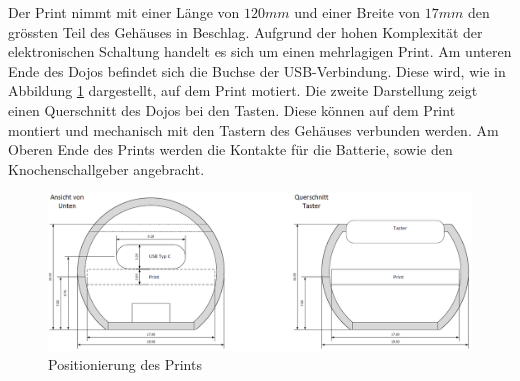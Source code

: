 Der Print nimmt mit einer Länge von $120mm$ und einer Breite von $17mm$ den grössten Teil des Gehäuses in Beschlag. Aufgrund der hohen Komplexität der elektronischen Schaltung handelt es sich um einen mehrlagigen Print. Am unteren Ende des Dojos befindet sich die Buchse der USB-Verbindung. Diese wird, wie in Abbildung \ref{fig:DojoPrintQuerschnitt} dargestellt, auf dem Print motiert. Die zweite Darstellung zeigt einen Querschnitt des Dojos bei den Tasten. Diese können auf dem Print montiert und mechanisch mit den Tastern des Gehäuses verbunden werden. Am Oberen Ende des Prints werden die Kontakte für die Batterie, sowie den Knochenschallgeber angebracht.

\begin{figure}[h]
	\centering
	\includegraphics[width=\textwidth]{graphics/DojoPrintQuerschnitt.png}
	\caption{Positionierung des Prints}
	\label{fig:DojoPrintQuerschnitt}
\end{figure}


